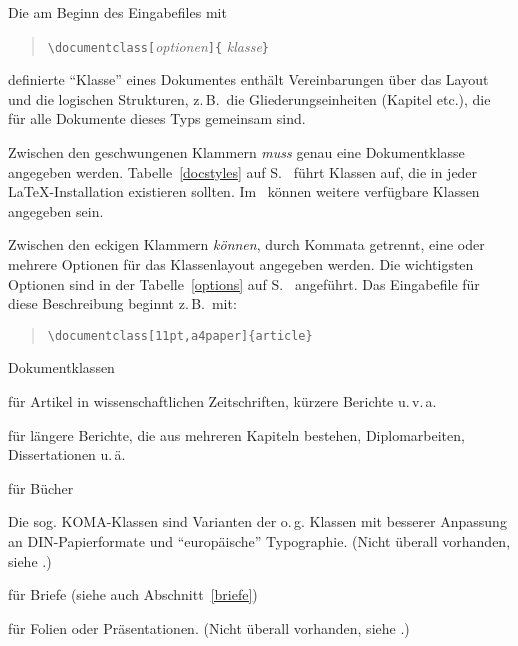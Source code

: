 Die am Beginn des Eingabefiles  mit
\begin{verse}
\verb|\documentclass[|\textit{optionen}\verb|]{|%
  \textit{klasse}\verb|}|
\end{verse}
definierte "`Klasse"' eines Dokumentes enthält 
Vereinbarungen über 
das Layout und die logischen Strukturen, z.\,B.\ die 
Gliederungseinheiten (Kapitel etc.\@), 
die für alle Dokumente dieses Typs gemeinsam sind.

Zwischen den geschwungenen Klammern \emph{muss} genau eine Dokumentklasse
angegeben werden.  Tabelle~\ref{docstyles} auf S.~\pageref{docstyles}
führt Klassen auf,
die in jeder \LaTeX-Installation existieren sollten.  
Im \local\ können weitere verfügbare 
Klassen angegeben sein.  
 
Zwischen den eckigen Klammern \emph{können}, durch Kommata getrennt, 
eine oder mehrere Optionen für das Klassenlayout
angegeben werden. Die wichtigsten Optionen sind in der 
Tabelle~\ref{options} auf S.~\pageref{options} angeführt.
Das Eingabefile für diese Beschreibung beginnt z.\,B.\ mit:
\begin{verse}
\verb|\documentclass[11pt,a4paper]{article}|
\end{verse}

\begin{table}[hbpt]
\caption{Dokumentklassen} \label{docstyles}
\oben{11cm}
\begin{ttdescription}%
\item [article] für Artikel in wissenschaftlichen Zeitschriften,
  kürzere Berichte u.\,v.\,a.
 
\item [report] für längere Berichte, die aus mehreren Kapiteln
  bestehen, Diplomarbeiten, Dissertationen u.\,ä.
 
\item [book] für Bücher

\item[scrartcl, scrreprt, scrbook]\quad Die sog. KOMA-Klassen 
sind Varianten der o.\,g. Klassen
mit besserer Anpassung an DIN-Papierformate und "`europäische"'
Typographie. 
(Nicht überall vorhanden, siehe \local.)


\item [letter] für Briefe (siehe auch Abschnitt~\ref{briefe})

\item [foils] für Folien oder Präsentationen.
(Nicht überall vorhanden, siehe \local.)
  
\end{ttdescription}
\unten
\end{table}

